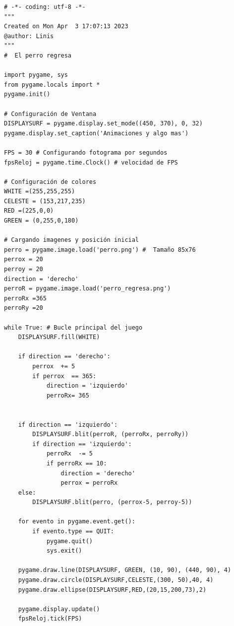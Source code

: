 \vspace{-0.2cm}
\hspace{-2.5cm}{\ttfamily \scriptsize \_perro.py}\vspace{-0.84cm}
\begin{lstlisting}
# -*- coding: utf-8 -*-
"""
Created on Mon Apr  3 17:07:13 2023
@author: Linis
"""
#  El perro regresa

import pygame, sys
from pygame.locals import *
pygame.init()

# Configuración de Ventana
DISPLAYSURF = pygame.display.set_mode((450, 370), 0, 32)
pygame.display.set_caption('Animaciones y algo mas')

FPS = 30 # Configurando fotograma por segundos
fpsReloj = pygame.time.Clock() # velocidad de FPS

# Configuración de colores
WHITE =(255,255,255)
CELESTE = (153,217,235)
RED =(225,0,0)
GREEN = (0,255,0,180)

# Cargando imagenes y posición inicial 
perro = pygame.image.load('perro.png') #  Tamaño 85x76 
perrox = 20
perroy = 20
direction = 'derecho'
perroR = pygame.image.load('perro_regresa.png')
perroRx =365
perroRy =20 

while True: # Bucle principal del juego
    DISPLAYSURF.fill(WHITE)

    if direction == 'derecho':
        perrox  += 5
        if perrox  == 365:
            direction = 'izquierdo' 
            perroRx= 365


    if direction == 'izquierdo':
        DISPLAYSURF.blit(perroR, (perroRx, perroRy))                    
        if direction == 'izquierdo':
            perroRx  -= 5
            if perroRx == 10:
                direction = 'derecho'
                perrox = perroRx
    else:
        DISPLAYSURF.blit(perro, (perrox-5, perroy-5)) 
    
    for evento in pygame.event.get():
        if evento.type == QUIT:
            pygame.quit()
            sys.exit()

    pygame.draw.line(DISPLAYSURF, GREEN, (10, 90), (440, 90), 4)
    pygame.draw.circle(DISPLAYSURF,CELESTE,(300, 50),40, 4)
    pygame.draw.ellipse(DISPLAYSURF,RED,(20,15,200,73),2)
    
    pygame.display.update()
    fpsReloj.tick(FPS)
\end{lstlisting}

